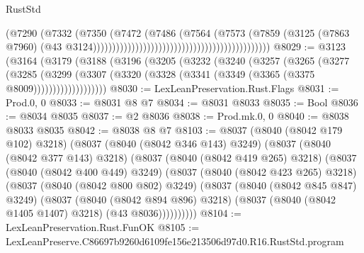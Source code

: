 \begin{lexlean}{RustStd}
\begin{coremodule}
                                                                            (@7290
                                                                              (@7332
                                                                                (@7350
                                                                                  (@7472
                                                                                    (@7486
                                                                                      (@7564
                                                                                        (@7573
                                                                                          (@7859
                                                                                            (@3125
                                                                                              (@7863
                                                                                                @7960)
                                                                                              (@43
                                                                                                @3124))))))))))))))))))))))))))))))))))))))))))))))
@8029 := @3123
    (@3164
      (@3179
        (@3188
          (@3196
            (@3205
              (@3232
                (@3240
                  (@3257
                    (@3265
                      (@3277
                        (@3285
                          (@3299
                            (@3307
                              (@3320 (@3328 (@3341 (@3349 (@3365 (@3375 @8009)))))))))))))))))))
@8030 := LexLeanPreservation.Rust.Flags
@8031 := Prod.{0, 0}
@8033 := @8031 @8 @7
@8034 := @8031 @8033
@8035 := Bool
@8036 := @8034 @8035
@8037 := @2 @8036
@8038 := Prod.mk.{0, 0}
@8040 := @8038 @8033 @8035
@8042 := @8038 @8 @7
@8103 := @8037
    (@8040 (@8042 @179 @102) @3218)
    (@8037
      (@8040 (@8042 @346 @143) @3249)
      (@8037
        (@8040 (@8042 @377 @143) @3218)
        (@8037
          (@8040 (@8042 @419 @265) @3218)
          (@8037
            (@8040 (@8042 @400 @449) @3249)
            (@8037
              (@8040 (@8042 @423 @265) @3218)
              (@8037
                (@8040 (@8042 @800 @802) @3249)
                (@8037
                  (@8040 (@8042 @845 @847) @3249)
                  (@8037
                    (@8040 (@8042 @894 @896) @3218)
                    (@8037 (@8040 (@8042 @1405 @1407) @3218) (@43 @8036))))))))))
@8104 := LexLeanPreservation.Rust.FunOK
@8105 := LexLeanPreserve.C86697b9260d6109fe156e213506d97d0.R16.RustStd.program

\end{coremodule}
\end{lexlean}
